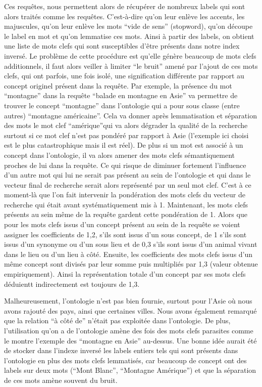 \documentclass{article}
\begin{document}
Ces requêtes, nous permettent alors de récupérer de nombreux labels qui sont
alors traités comme les requêtes. C’est-à-dire qu’on leur enlève les accents,
les majuscules, qu’on leur enlève les mots “vide de sens” (stopword), qu’on
découpe le label en mot et qu’on lemmatise ces mots. Ainsi à partir des labels,
on obtient une liste de mots clefs qui sont susceptibles d’être présents dans
notre index inversé. Le problème de cette procédure est qu’elle génère beaucoup
de mots clefs additionnels, il faut alors veiller à limiter “le bruit” amené
par l’ajout de ces mots clefs, qui ont parfois, une fois isolé, une
signification différente par rapport au concept originel présent dans la
requête. Par exemple, la présence du mot “montagne” dans la requête “balade en
montagne en Asie” va permettre de trouver le concept “montagne” dans
l’ontologie qui a pour sous classe (entre autres) “montagne américaine”. Cela
va donner après lemmatisation et séparation des mots le mot clef “amérique”qui
va alors dégrader la qualité de la recherche surtout si ce mot clef n’est pas
pondéré par rapport à Asie (l’exemple ici choisi est le plus catastrophique
mais il est réel). De plus si un mot est associé à un concept dans l’ontologie,
il va alors amener des mots clefs sémantiquement proches de lui dans la
requête. Ce qui risque de diminuer fortement l’influence d’un autre mot qui lui
ne serait pas présent au sein de l’ontologie et qui dans le vecteur final de
recherche serait alors représenté par un seul mot clef.  C’est à ce moment-là
que l’on fait intervenir la pondération des mots clefs du vecteur de recherche
qui était avant systématiquement mis à 1. Maintenant, les mots clefs présents
au sein même de la requête gardent cette pondération de 1. Alors que pour les
mots clefs issus d’un concept présent au sein de la requête se voient assigner
les coefficients de 1,2, s’ils sont issus d’un sous concept, de 1 s’ils sont
issus d’un synonyme ou d’un sous lieu et de 0,3 s’ils sont issus d’un animal
vivant dans le lieu ou d’un lieu à côté. Ensuite, les coefficients des mots
clefs issus d’un même concept sont divisés par leur somme puis multipliés par
1,3 (valeur obtenue empiriquement). Ainsi la représentation totale d’un concept
par ses mots clefs déduientt indirectement est toujours de 1,3.

Malheureusement, l’ontologie n’est pas bien fournie, surtout pour l’Asie où nous
avons rajouté des pays, ainsi que certaines villes. Nous avons également remarqué que la
relation “à côté de” n’était pas exploitée dans l’ontologie. De plus, l’utilisation
qu’on a de l’ontologie amène des fois des mots clefs parasites comme le montre
l’exemple des “montagne en Asie” au-dessus. Une bonne idée aurait été de stocker dans
l’indexe inversé les labels entiers tels qui sont présents dans l’ontologie en plus
des mots clefs lemmatisés, car beaucoup de concept ont des labels sur deux mots
(“Mont Blanc”, “Montagne Amérique”) et que la séparation de ces mots amène souvent
du bruit.
\end{document}
